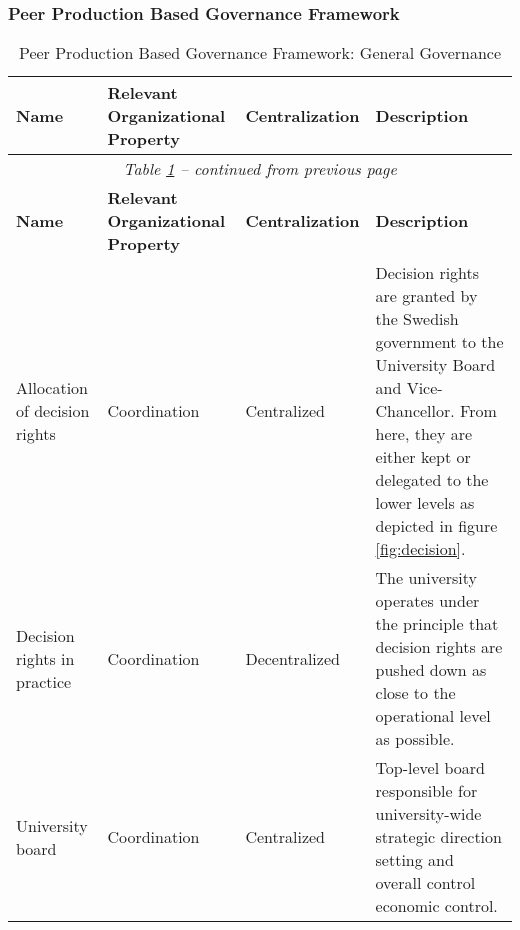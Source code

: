 
\subsubsection{Peer Production Based Governance Framework}

\begin{center}
\begin{longtable}{ | p{} | p{}| p{} | p{}|}
\caption{Peer Production Based Governance Framework: General Governance} \label{table:peerGeneralGovernance} \\
%
\hline
\textbf{Name} & 
\textbf{Relevant Organizational Property} &
\textbf{Centralization} &  
\textbf{Description} \\ \hline
\endfirsthead
%
\multicolumn{4}{c}{\textit{Table \ref{table:peerGeneralGovernance} -- continued from previous page}} \\  
\hline
\textbf{Name} & 
\textbf{Relevant Organizational Property} &
\textbf{Centralization} &  
\textbf{Description} \\ \hline
\endhead
%
 Allocation of decision rights & 
 Coordination &
 Centralized & 
 Decision rights are granted by the Swedish government to the University Board and Vice-Chancellor. From here, they are either kept or delegated to the lower levels as depicted in figure \ref{fig:decision}. \\
%
\hline
%
 Decision rights in practice & 
 Coordination &
 Decentralized & 
 The university operates under the principle that decision rights are pushed down as close to the operational level as possible. \\
%
\hline
%
%
%
 University board &
 Coordination &
 Centralized &
 Top-level board responsible for university-wide strategic direction setting and overall control economic control. \\
%
\hline
%
 

\end{longtable}
\end{center}

